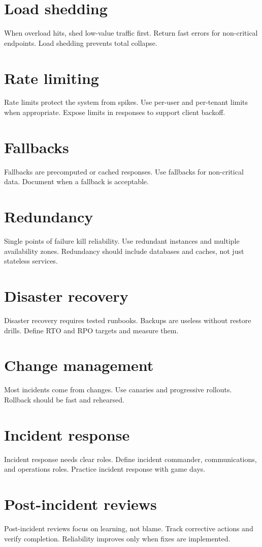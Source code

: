 \section{Load shedding}
When overload hits, shed low-value traffic first.
Return fast errors for non-critical endpoints.
Load shedding prevents total collapse.

\section{Rate limiting}
Rate limits protect the system from spikes.
Use per-user and per-tenant limits when appropriate.
Expose limits in responses to support client backoff.

\section{Fallbacks}
Fallbacks are precomputed or cached responses.
Use fallbacks for non-critical data.
Document when a fallback is acceptable.

\section{Redundancy}
Single points of failure kill reliability.
Use redundant instances and multiple availability zones.
Redundancy should include databases and caches, not just stateless services.

\section{Disaster recovery}
Disaster recovery requires tested runbooks.
Backups are useless without restore drills.
Define RTO and RPO targets and measure them.

\section{Change management}
Most incidents come from changes.
Use canaries and progressive rollouts.
Rollback should be fast and rehearsed.

\section{Incident response}
Incident response needs clear roles.
Define incident commander, communications, and operations roles.
Practice incident response with game days.

\section{Post-incident reviews}
Post-incident reviews focus on learning, not blame.
Track corrective actions and verify completion.
Reliability improves only when fixes are implemented.

